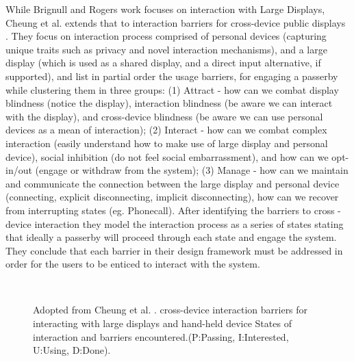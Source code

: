 While Brignull and Rogers work focuses on interaction with Large Displays, Cheung et al.  extends that to interaction barriers for cross-device public displays \cite{Cheung:2014}. They focus on interaction process comprised of personal devices (capturing unique traits such as privacy and novel interaction mechanisms), and a large display (which is used as a shared display, and a direct input alternative, if supported), and list in partial order the usage barriers, for engaging a passerby while clustering them in three groups: (1) Attract - how can we combat display blindness (notice the display), interaction blindness (be aware we can interact with the display), and cross-device blindness (be aware we can use personal devices as a mean of interaction); (2) Interact - how can we combat complex interaction (easily understand how to make use of large display and personal device), social inhibition (do not feel social embarrassment),  and how can we opt-in/out (engage or withdraw from the system); (3) Manage - how can we maintain and communicate the connection between the large display and personal device (connecting, explicit disconnecting, implicit disconnecting), how can we recover from interrupting states (eg. Phonecall). After identifying the barriers to cross - device interaction  they model the interaction process as a series of states  stating that ideally a passerby will proceed through each state and engage the system. They conclude that each barrier in their design framework must be addressed in order for the users to be enticed to interact with the system.


\begin{figure}[H]
	\centering
	\\ 
	\caption{
		Adopted from Cheung et al. \protect\cite{Cheung:2014}.
		\protect{} cross-device interaction barriers for interacting with large displays and hand-held device
		\protect{} States  of interaction and barriers encountered.(P:Passing, I:Interested, U:Using, D:Done).
		}
	\label{fig:Cheung et al. ideas}
\end{figure}

